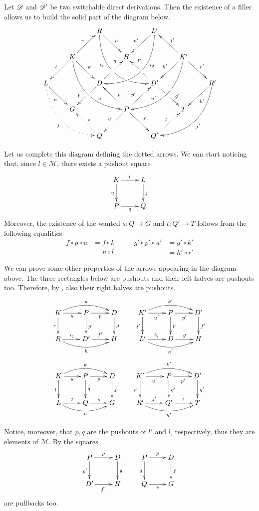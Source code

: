 \begin{remark}\label{rem:deco} Let $\mathscr{D}$ and $\mathscr{D'}$ be two switchable direct derivations. Then the existence of a filler allows us to build the solid part of the diagram below.
	\[\xymatrix{&&R \ar@/_1cm/[ddrr]_(.35){i_1}|(.7)\hole  \ar[dr]^{h}&& L'\ar@/^1cm/[ddll]^(.35){i_2}  \ar[dl]_{n'}\\&K\ar[dr]^{k}\ar[dl]_{l} \ar@/_.8cm/[ddrr]^(.65){u}\ar[ur]^{r}&& H && K' \ar@/^.8cm/[ddll]_(.65){u'}\ar[dl]_{k'}\ar[lu]_{l'} \ar[dr]^{r'}\\L \ar[dr]_{n} \ar@{.>}@/_.8cm/[ddrr]_{j}&& D \ar[dl]|(.42)\hole_(.64){f}\ar[ur]|(.48)\hole^(.7){g}&&D' \ar[dr]|(.42)\hole^(.65){g'} \ar[ul]|(.48)\hole_(.7){f'}&&R'\ar@/^.8cm/[ddll]^{j'}\ar[dl]^{h'}\\&G &&P\ar[dr]^{q'} \ar@{.>}[dl]_{q}\ar[ur]^(.4){p'}\ar[ul]_(.4){p}&&T\\&&Q \ar@{.>}[ul]_{s} &&Q'\ar@{.>}[ur]^{t}}\]
	
	Let us complete this diagram defining the dotted arrows. We can start noticing that, since $l\in \mathcal{M}$, there exists a pushout square 
	\[\xymatrix{K \ar[r]^{l} \ar[d]_{u}& L\ar[d]^{j} \\ P \ar[r]_{q} & Q}\]
	Moreover, the existence of the wanted $s\colon Q\to G$ and $t\colon Q'\to T$ follows from the following equalities
	\[\begin{split}
		f\circ p \circ u &= f\circ k \\&= n\circ l
	\end{split} \qquad \begin{split}
		g'\circ p'\circ u' &= g'\circ k'\\&=h'\circ r'
	\end{split}\]
	
	We can prove some other properties of the arrows appearing in the diagram above. The three rectangles below are pushouts and their left halves are pushouts too. Therefore, by , also their right halves are pushouts.
	\[\xymatrix{K \ar@/^.4cm/[rr]^{u}\ar[d]_{r}\ar[r]_{u} &P\ar[d]^{p'} \ar[r]_{p} & D \ar[d]^{g}&K' \ar@/^.4cm/[rr]^{k'}\ar[d]_{l'}\ar[r]_{u'} &P\ar[d]^{p} \ar[r]_{p'} & D' \ar[d]^{f'}\\  R \ar@/_.4cm/[rr]_{h} \ar[r]^{i_1}&D' \ar[r]^{f'} & H&L' \ar@/_.4cm/[rr]_{n'} \ar[r]^{i_2}&D \ar[r]^{g} & H}\]
	\[ \xymatrix{K \ar@/^.4cm/[rr]^{k}\ar[d]_{l}\ar[r]_{u} &P\ar[d]^{q} \ar[r]_{p} & D \ar[d]^{f}&K' \ar@/^.4cm/[rr]^{k'}\ar[d]_{r'}\ar[r]_{u'} &P\ar[d]^{q'} \ar[r]_{p'} & D' \ar[d]^{g'}\\ L \ar@/_.4cm/[rr]_{n} \ar[r]^{j}&Q \ar[r]^{s} & G&R' \ar@/_.4cm/[rr]_{h'} \ar[r]^{j'}&Q' \ar[r]^{t} & T}\]
	
	Notice, moreover, that $p, q$ are the pushouts of $l'$ and $l$, respectively, thus they  are elements of $\mathcal{M}$. By  the squares
	\[\xymatrix{P\ar[r]^{p} \ar[d]_{p'} & D \ar[d]^{g}& P \ar[r]^{p} \ar[d]_{q} &D\ar[d]^{f}\\ D' \ar[r]_{f'} & H & Q \ar[r]_{s}& G}\]
	are pullbacks too.
\end{remark}


